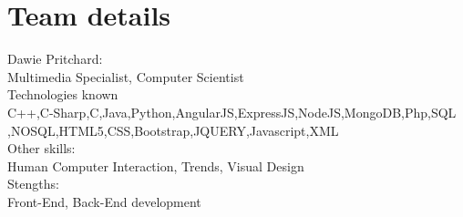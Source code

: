 \documentclass{article}
\begin{document}
\section{Team details}
Dawie Pritchard: \\Multimedia Specialist, Computer Scientist\\
Technologies known\\ C++,C-Sharp,C,Java,Python,AngularJS,ExpressJS,NodeJS,MongoDB,Php,SQL\\,NOSQL,HTML5,CSS,Bootstrap,JQUERY,Javascript,XML\\
Other skills:\\ Human Computer Interaction, Trends, Visual Design \\
Stengths: \\Front-End, Back-End development
\end{document}
